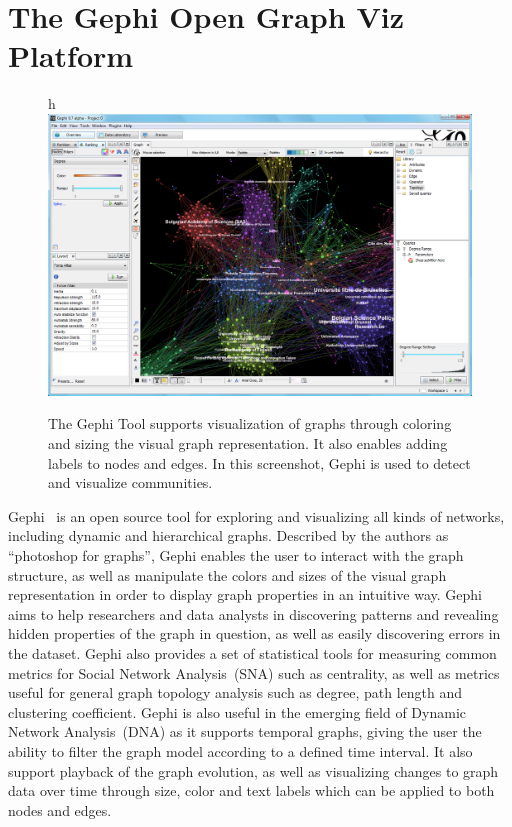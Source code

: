 \section{The Gephi Open Graph Viz Platform}

\begin{figure}{h}
    \centering
    \includegraphics[width=\textwidth]{img/gephi1}
    \caption{The Gephi Tool supports
        visualization of graphs through coloring and sizing the visual
        graph
        representation. It also enables adding labels to nodes and
        edges. In
        this screenshot, Gephi is used to detect and visualize
    communities.}
\label{img:gephi1}
\end{figure}

Gephi~\cite{ICWSM09154} is an open source tool for exploring and
visualizing all kinds of networks, including dynamic and hierarchical
graphs. Described by the authors as ``photoshop for graphs'', Gephi
enables the user to interact with the graph structure, as well as
manipulate the colors and sizes of the visual graph representation in
order to display graph properties in an intuitive way. Gephi aims to
help researchers and data analysts in discovering patterns and revealing
hidden properties of the graph in question, as well as easily
discovering errors in the dataset. Gephi also provides a set of
statistical tools for measuring common metrics for Social Network
Analysis~(SNA) such as centrality, as well as metrics useful for general
graph topology analysis such as degree, path length and clustering
coefficient. Gephi is also useful in the emerging field of Dynamic
Network Analysis~(DNA)  as it supports temporal graphs, giving the user
the ability to filter the graph model according to a defined time
interval. It also support playback of the graph evolution, as well as
visualizing changes to graph data over time through size, color and text
labels which can be applied to both nodes and edges.


